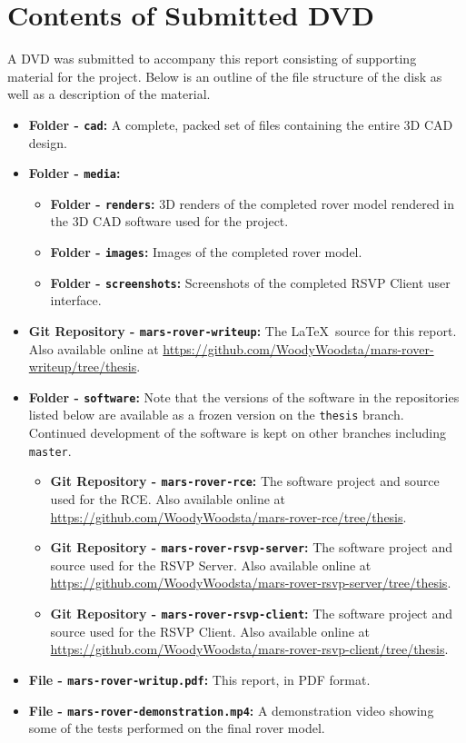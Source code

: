 \chapter{Contents of Submitted DVD}
  A DVD was submitted to accompany this report consisting of supporting material for the project. Below is an outline of the file structure of the disk as well as a description of the material.
  
  \begin{itemize}
    \item \textbf{Folder - \texttt{cad}:} A complete, packed set of files containing the entire 3D CAD design.
    \item \textbf{Folder - \texttt{media}:}
      \begin{itemize}
        \item \textbf{Folder - \texttt{renders}:} 3D renders of the completed rover model rendered in the 3D CAD software used for the project.
        \item \textbf{Folder - \texttt{images}:} Images of the completed rover model.
        \item \textbf{Folder - \texttt{screenshots}:} Screenshots of the completed RSVP Client user interface.
      \end{itemize}
    \item \textbf{Git Repository - \texttt{mars-rover-writeup}:} The \LaTeX~source for this report. Also available online at \url{https://github.com/WoodyWoodsta/mars-rover-writeup/tree/thesis}.
    \item \textbf{Folder - \texttt{software}:} Note that the versions of the software in the repositories listed below are available as a frozen version on the \texttt{thesis} branch. Continued development of the software is kept on other branches including \texttt{master}.
      \begin{itemize}
        \item \textbf{Git Repository - \texttt{mars-rover-rce}:} The software project and source used for the RCE. Also available online at \url{https://github.com/WoodyWoodsta/mars-rover-rce/tree/thesis}.
        \item \textbf{Git Repository - \texttt{mars-rover-rsvp-server}:} The software project and source used for the RSVP Server. Also available online at \url{https://github.com/WoodyWoodsta/mars-rover-rsvp-server/tree/thesis}.
        \item \textbf{Git Repository - \texttt{mars-rover-rsvp-client}:} The software project and source used for the RSVP Client. Also available online at \url{https://github.com/WoodyWoodsta/mars-rover-rsvp-client/tree/thesis}.
      \end{itemize}
    \item \textbf{File - \texttt{mars-rover-writup.pdf}:} This report, in PDF format.
    \item \textbf{File - \texttt{mars-rover-demonstration.mp4}:} A demonstration video showing some of the tests performed on the final rover model.
  \end{itemize}